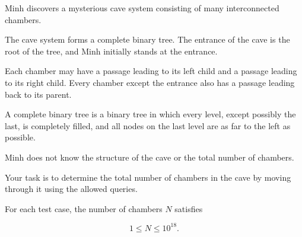 Minh discovers a mysterious cave system consisting of many interconnected chambers.

The cave system forms a complete binary tree. The entrance of the cave is the root of the tree, and Minh initially stands at the entrance.

Each chamber may have a passage leading to its left child and a passage leading to its right child. Every chamber except the entrance also has a passage leading back to its parent.

A complete binary tree is a binary tree in which every level, except possibly the last, is completely filled, and all nodes on the last level are as far to the left as possible.

Minh does not know the structure of the cave or the total number of chambers.

Your task is to determine the total number of chambers in the cave by moving through it using the allowed queries.

For each test case, the number of chambers $N$ satisfies

$$1 \le N \le 10^{18}.$$